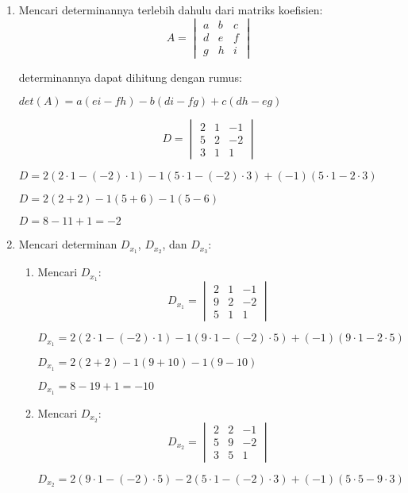 \documentclass[a4paper]{article}
\begin{document}
\begin{enumerate}[itemsep=1em,leftmargin=*]
  \begin{enumerate}
    \item Mencari determinannya terlebih dahulu dari matriks koefisien:
    \[
    A = \begin{vmatrix}
    a & b & c \\
    d & e & f \\
    g & h & i
    \end{vmatrix}
    \]

    determinannya dapat dihitung dengan rumus:

    \(det(A) = a(ei - fh) - b(di - fg) + c(dh - eg)\)

    \[
    D = \begin{vmatrix}
    2 & 1 & -1 \\
    5 & 2 & -2 \\
    3 & 1 & 1
    \end{vmatrix}
    \]

    \(D = 2(2 \cdot 1 - (-2) \cdot 1) - 1(5 \cdot 1 - (-2) \cdot 3) + (-1)(5 \cdot 1 - 2 \cdot 3)\)

    \(D = 2(2 + 2) - 1(5 + 6) - 1(5 - 6)\)

    \(D = 8 - 11 + 1 = -2\)

    \item Mencari determinan \(D_{x_1}\), \(D_{x_2}\), dan \(D_{x_3}\):
      \begin{enumerate}
        \item Mencari \(D_{x_1}\):
        \[
        D_{x_1} = \begin{vmatrix}
        2 & 1 & -1 \\
        9 & 2 & -2 \\
        5 & 1 & 1
        \end{vmatrix}
        \]

        \(D_{x_1} = 2(2 \cdot 1 - (-2) \cdot 1) - 1(9 \cdot 1 - (-2) \cdot 5) + (-1)(9 \cdot 1 - 2 \cdot 5)\)

        \(D_{x_1} = 2(2 + 2) - 1(9 + 10) - 1(9 - 10)\)

        \(D_{x_1} = 8 - 19 + 1 = -10\)

        \item Mencari \(D_{x_2}\):
        \[
        D_{x_2} = \begin{vmatrix}
        2 & 2 & -1 \\
        5 & 9 & -2 \\
        3 & 5 & 1
        \end{vmatrix}
        \]

        \(D_{x_2} = 2(9 \cdot 1 - (-2) \cdot 5) - 2(5 \cdot 1 - (-2) \cdot 3) + (-1)(5 \cdot 5 - 9 \cdot 3)\)


\end{enumerate}
\end{enumerate}
\end{enumerate}
\end{document}
